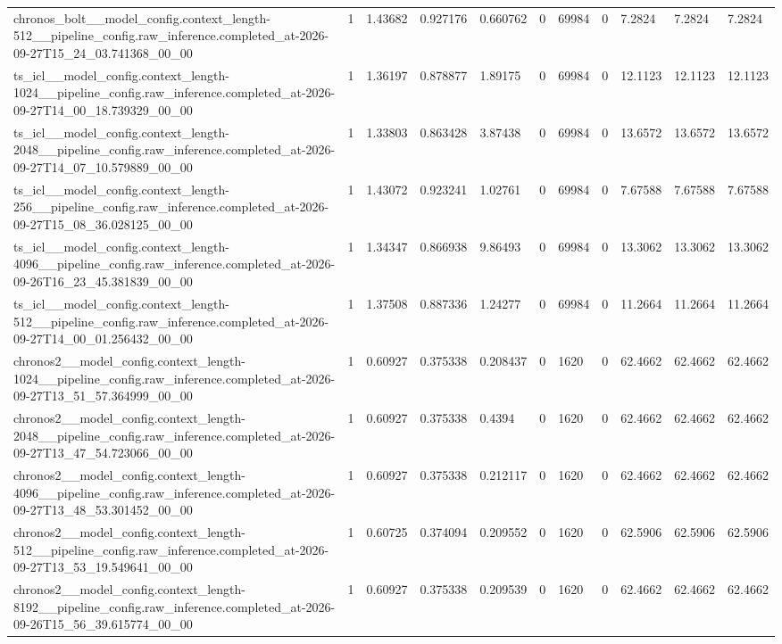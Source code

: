 \begin{tabular}{lllllllllll}
chronos\_bolt\_\_model\_config.context\_length-512\_\_pipeline\_config.raw\_inference.completed\_at-2026-09-27T15\_24\_03.741368\_00\_00 & 1 & 1.43682 & 0.927176 & 0.660762 & 0 & 69984 & 0 & 7.2824 & 7.2824 & 7.2824 \\
ts\_icl\_\_model\_config.context\_length-1024\_\_pipeline\_config.raw\_inference.completed\_at-2026-09-27T14\_00\_18.739329\_00\_00 & 1 & 1.36197 & 0.878877 & 1.89175 & 0 & 69984 & 0 & 12.1123 & 12.1123 & 12.1123 \\
ts\_icl\_\_model\_config.context\_length-2048\_\_pipeline\_config.raw\_inference.completed\_at-2026-09-27T14\_07\_10.579889\_00\_00 & 1 & 1.33803 & 0.863428 & 3.87438 & 0 & 69984 & 0 & 13.6572 & 13.6572 & 13.6572 \\
ts\_icl\_\_model\_config.context\_length-256\_\_pipeline\_config.raw\_inference.completed\_at-2026-09-27T15\_08\_36.028125\_00\_00 & 1 & 1.43072 & 0.923241 & 1.02761 & 0 & 69984 & 0 & 7.67588 & 7.67588 & 7.67588 \\
ts\_icl\_\_model\_config.context\_length-4096\_\_pipeline\_config.raw\_inference.completed\_at-2026-09-26T16\_23\_45.381839\_00\_00 & 1 & 1.34347 & 0.866938 & 9.86493 & 0 & 69984 & 0 & 13.3062 & 13.3062 & 13.3062 \\
ts\_icl\_\_model\_config.context\_length-512\_\_pipeline\_config.raw\_inference.completed\_at-2026-09-27T14\_00\_01.256432\_00\_00 & 1 & 1.37508 & 0.887336 & 1.24277 & 0 & 69984 & 0 & 11.2664 & 11.2664 & 11.2664 \\
chronos2\_\_model\_config.context\_length-1024\_\_pipeline\_config.raw\_inference.completed\_at-2026-09-27T13\_51\_57.364999\_00\_00 & 1 & 0.60927 & 0.375338 & 0.208437 & 0 & 1620 & 0 & 62.4662 & 62.4662 & 62.4662 \\
chronos2\_\_model\_config.context\_length-2048\_\_pipeline\_config.raw\_inference.completed\_at-2026-09-27T13\_47\_54.723066\_00\_00 & 1 & 0.60927 & 0.375338 & 0.4394 & 0 & 1620 & 0 & 62.4662 & 62.4662 & 62.4662 \\
chronos2\_\_model\_config.context\_length-4096\_\_pipeline\_config.raw\_inference.completed\_at-2026-09-27T13\_48\_53.301452\_00\_00 & 1 & 0.60927 & 0.375338 & 0.212117 & 0 & 1620 & 0 & 62.4662 & 62.4662 & 62.4662 \\
chronos2\_\_model\_config.context\_length-512\_\_pipeline\_config.raw\_inference.completed\_at-2026-09-27T13\_53\_19.549641\_00\_00 & 1 & 0.60725 & 0.374094 & 0.209552 & 0 & 1620 & 0 & 62.5906 & 62.5906 & 62.5906 \\
chronos2\_\_model\_config.context\_length-8192\_\_pipeline\_config.raw\_inference.completed\_at-2026-09-26T15\_56\_39.615774\_00\_00 & 1 & 0.60927 & 0.375338 & 0.209539 & 0 & 1620 & 0 & 62.4662 & 62.4662 & 62.4662 \\

\end{tabular}
